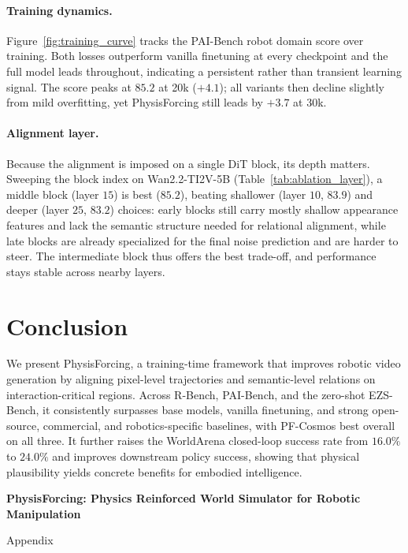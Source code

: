 \documentclass{llmxive}
\begin{document}
\paragraph{Training dynamics.}
Figure~\ref{fig:training_curve} tracks the PAI-Bench robot domain score over training. Both
losses outperform vanilla finetuning at every checkpoint and the full model leads throughout,
indicating a persistent rather than transient learning signal. The score peaks at $85.2$ at
20k ($+4.1$); all variants then decline slightly from mild overfitting, yet PhysisForcing
still leads by $+3.7$ at 30k.

\paragraph{Alignment layer.}
Because the alignment is imposed on a single DiT block, its depth matters. Sweeping the block
index on Wan2.2-TI2V-5B (Table~\ref{tab:ablation_layer}), a middle block (layer $15$) is best
($85.2$), beating shallower (layer $10$, $83.9$) and deeper (layer $25$, $83.2$) choices: early
blocks still carry mostly shallow appearance features and lack the semantic structure needed
for relational alignment, while late blocks are already specialized for the final noise prediction and
are harder to steer. The intermediate block thus offers the best trade-off, and performance
stays stable across nearby layers.
\section{Conclusion}

We present PhysisForcing, a training-time framework that improves robotic video generation by
aligning pixel-level trajectories and semantic-level relations on interaction-critical regions.
Across R-Bench, PAI-Bench, and the zero-shot EZS-Bench, it consistently surpasses base models,
vanilla finetuning, and strong open-source, commercial, and robotics-specific baselines, with
PF-Cosmos best overall on all three. It further raises the WorldArena closed-loop success rate
from $16.0\%$ to $24.0\%$ and improves downstream policy success, showing that physical
plausibility yields concrete benefits for embodied intelligence.




\setlength{\bibhang}{0pt}
\setlength\bibindent{0pt}



\appendix

{
  \centering 
  \textbf{\Large PhysisForcing: Physics Reinforced World Simulator for Robotic Manipulation}
  
  \vspace{5pt}
  {\Large Appendix}
  \par
}
\end{document}
